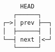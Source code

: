\documentclass[varwidth]{standalone}
\begin{document}
\begin{verbatim}
     HEAD
   ┌──────┐
┌─>│ prev ├──┐
│  ├──────┤  │
└──┤ next │<─┘
   └──────┘
\end{verbatim}
\end{document}
